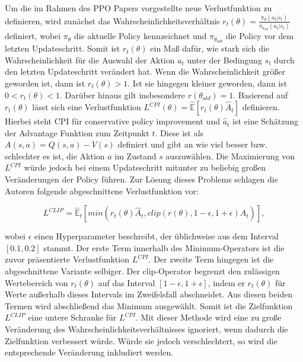 Um die im Rahmen des \ac{PPO} Papers vorgestellte neue Verlustfunktion zu definieren, wird zunächst das Wahrscheinlichkeitsverhältnis $r_t(\theta) = \frac{\pi_\theta(a_t|s_t)}{\pi_{\theta_{old}}(a_t|s_t)}$ definiert, wobei $\pi_\theta$ die aktuelle Policy kennzeichnet und $\pi_{\theta_{old}}$ die Policy vor dem letzten Updateschritt. Somit ist $r_t(\theta)$ ein Maß dafür, wie stark sich die Wahrscheinlichkeit für die Auswahl der Aktion $a_t$ unter der Bedingung $s_t$ durch den letzten Updateschritt verändert hat. Wenn die Wahrscheinlichkeit größer geworden ist, dann ist $r_t(\theta) > 1$. Ist sie hingegen kleiner geworden, dann ist $0 < r_t(\theta) < 1$. Darüber hinaus gilt insbesondere $r(\theta_{old}) = 1$. Basierend auf $r_t(\theta)$ lässt sich eine Verlustfunktion $L^{CPI}(\theta) = \hat{\mathbb{E}}[r_t(\theta) \hat{A}_t]$ definieren. Hierbei steht CPI für conservative policy improvement und $\hat{a}_t$ ist eine Schätzung der Advantage Funktion zum Zeitpunkt $t$. Diese ist als $A(s,a) = Q(s,a) - V(s)$ definiert und gibt an wie viel besser bzw. schlechter es ist, die Aktion $a$ im Zustand $s$ auszuwählen. Die Maximierung von $L^{CPI}$ würde jedoch bei einem Updateschritt mitunter zu beliebig großen Veränderungen der Policy führen. Zur Lösung dieses Problems schlagen die Autoren folgende abgeschnittene Verlustfunktion vor:

\begin{equation}
  \label{L_CLIP}
	L^{CLIP} = \hat{\mathbb{E}}_t[min(r_t(\theta) \hat{A}_t, clip(r(\theta), 1-\epsilon, 1+\epsilon) \hat{A}_t)],
\end{equation}

wobei $\epsilon$ einen Hyperparameter beschreibt, der üblichweise aus dem Interval $[0.1, 0.2]$ stammt. Der erste Term innerhalb des Minimum-Operators ist die zuvor präsentierte Verlustfunktion $L^{CPI}$. Der zweite Term hingegen ist die abgeschnittene Variante selbiger. Der clip-Operator begrenzt den zulässigen Wertebereich von $r_t(\theta)$ auf das Interval $[1-\epsilon, 1+\epsilon]$, indem er $r_t(\theta)$ für Werte außerhalb dieses Intervals im Zweifelsfall abschneidet. Aus diesen beiden Termen wird abschließend das Minimum ausgewählt. Somit ist die Zielfunktion $L^{CLIP}$ eine untere Schranke für $L^{CPI}$. Mit dieser Methode wird eine zu große Veränderung des Wahrscheinlichkeitsverhältnisses ignoriert, wenn dadurch die Zielfunktion verbessert würde. Würde sie jedoch verschlechtert, so wird die entsprechende Veränderung inkludiert werden.

